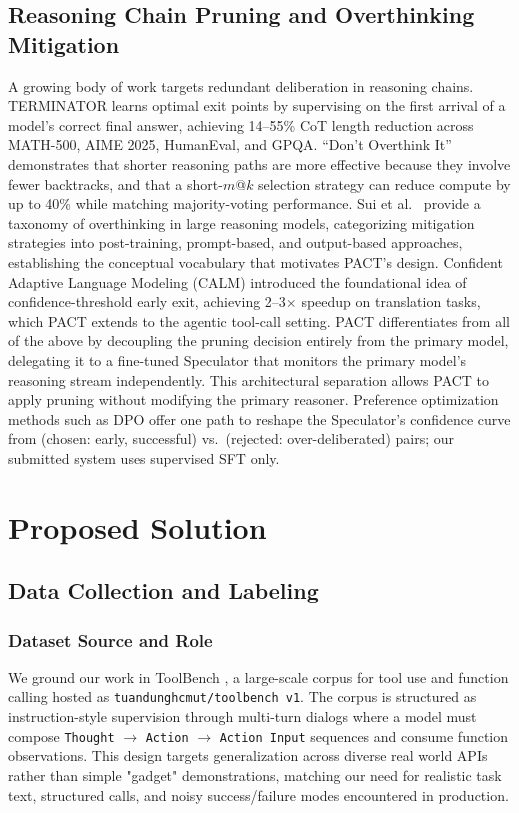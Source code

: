 \documentclass[letterpaper,twocolumn,10pt]{article}
\begin{document}
\subsection{Reasoning Chain Pruning and Overthinking Mitigation}
A growing body of work targets redundant deliberation in reasoning chains. TERMINATOR 
\cite{terminator2026} learns optimal exit points by supervising on the first arrival of 
a model's correct final answer, achieving 14--55\% CoT length reduction across MATH-500, 
AIME 2025, HumanEval, and GPQA. ``Don't Overthink It'' \cite{dontoverthink2025} 
demonstrates that shorter reasoning paths are more effective because they involve fewer 
backtracks, and that a short-$m$@$k$ selection strategy can reduce compute by up to 40\% 
while matching majority-voting performance. Sui et al.\ \cite{sui2025overthinking} 
provide a taxonomy of overthinking in large reasoning models, categorizing mitigation 
strategies into post-training, prompt-based, and output-based approaches, establishing 
the conceptual vocabulary that motivates PACT's design. Confident Adaptive Language 
Modeling (CALM) \cite{schuster2022calm} introduced the foundational idea of 
confidence-threshold early exit, achieving 2--3$\times$ speedup on translation tasks, 
which PACT extends to the agentic tool-call setting. PACT differentiates from all of 
the above by decoupling the pruning decision entirely from the primary model, delegating 
it to a fine-tuned Speculator that monitors the primary model's reasoning stream 
independently. This architectural separation allows PACT to apply pruning without 
modifying the primary reasoner. Preference optimization methods such as DPO 
\cite{rafailov2024direct} offer one path to reshape the Speculator's confidence 
curve from (chosen: early, successful) vs.\ (rejected: over-deliberated) pairs; 
our submitted system uses supervised SFT only.

\section{Proposed Solution}
\label{sec:proposed}

\subsection{Data Collection and Labeling}

\subsubsection{Dataset Source and Role}
We ground our work in ToolBench \cite{qin2023toolbench}, a large-scale corpus for tool use and function calling hosted as \texttt{tuandunghcmut/toolbench v1}. The corpus is structured as instruction-style supervision through multi-turn dialogs where a model must compose \texttt{Thought} $\rightarrow$ \texttt{Action} $\rightarrow$ \texttt{Action Input} sequences and consume function observations. This design targets generalization across diverse real world APIs rather than simple "gadget" demonstrations, matching our need for realistic task text, structured calls, and noisy success/failure modes encountered in production.
\end{document}
